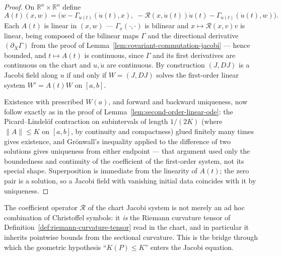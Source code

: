 \begin{proof}
\leanok
{}
On $\mathbb{R}^n\times\mathbb{R}^n$ define
$$A(t)(x,w)=\bigl(w-\Gamma_{u(t)}(\dot u(t),x),\;
-{\mathcal R}(x,\dot u(t))\dot u(t)-\Gamma_{u(t)}(\dot u(t),w)\bigr).$$
Each $A(t)$ is linear in $(x,w)$ — $\Gamma_x(\cdot,\cdot)$ is
bilinear and $x\mapsto{\mathcal R}(x,v)v$ is linear, being composed
of the bilinear maps $\Gamma$ and the directional derivative
$(\partial_X\Gamma)$ from the proof of
Lemma~\ref{lem:covariant-commutation-jacobi} — hence bounded, and
$t\mapsto A(t)$ is continuous, since $\Gamma$ and its first
derivatives are continuous on the chart and $u,\dot u$ are
continuous. By construction $(J,DJ)$ is a Jacobi field along $u$ if
and only if $W=(J,DJ)$ solves the first-order linear system
$W'=A(t)W$ on $[a,b]$.

Existence with prescribed $W(a)$, and forward and backward
uniqueness, now follow exactly as in the proof of
Lemma~\ref{lem:second-order-linear-ode}: the Picard--Lindel\"of
contraction on subintervals of length $1/(2K)$ (where
$\|A\|\le K$ on $[a,b]$, by continuity and compactness) glued
finitely many times gives existence, and Gr\"onwall's inequality
applied to the difference of two solutions gives uniqueness from
either endpoint — that argument used only the boundedness and
continuity of the coefficient of the first-order system, not its
special shape. Superposition is immediate from the linearity of
$A(t)$; the zero pair is a solution, so a Jacobi field with
vanishing initial data coincides with it by uniqueness.
\end{proof}

The coefficient operator ${\mathcal R}$ of the chart Jacobi system is
not merely an ad hoc combination of Christoffel symbols: it {\em is}
the Riemann curvature tensor of
Definition~\ref{def:riemann-curvature-tensor} read in the chart, and
in particular it inherits pointwise bounds from the sectional
curvature. This is the bridge through which the geometric hypothesis
``$K(P)\le K$'' enters the Jacobi equation.

